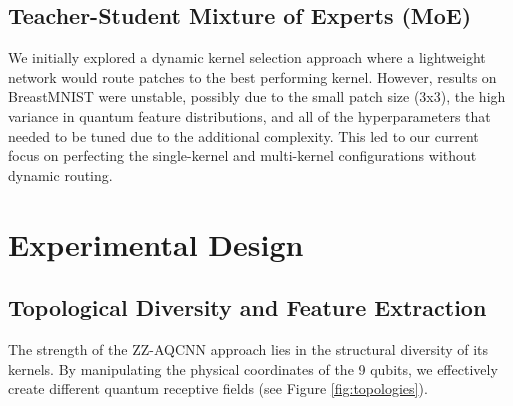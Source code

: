 \documentclass[11pt,a4paper]{article}
\begin{document}
\subsection{Teacher-Student Mixture of Experts (MoE)}
We initially explored a dynamic kernel selection approach where a lightweight network would route patches to the best performing kernel. However, results on BreastMNIST were unstable, possibly due to the small patch size (3x3), the high variance in quantum feature distributions, and all of the hyperparameters that needed to be tuned due to the additional complexity. This led to our current focus on perfecting the single-kernel and multi-kernel configurations without dynamic routing.

\section{Experimental Design}

\subsection{Topological Diversity and Feature Extraction}
The strength of the ZZ-AQCNN approach lies in the structural diversity of its kernels. By manipulating the physical coordinates of the 9 qubits, we effectively create different quantum receptive fields (see Figure \ref{fig:topologies}).
\end{document}
